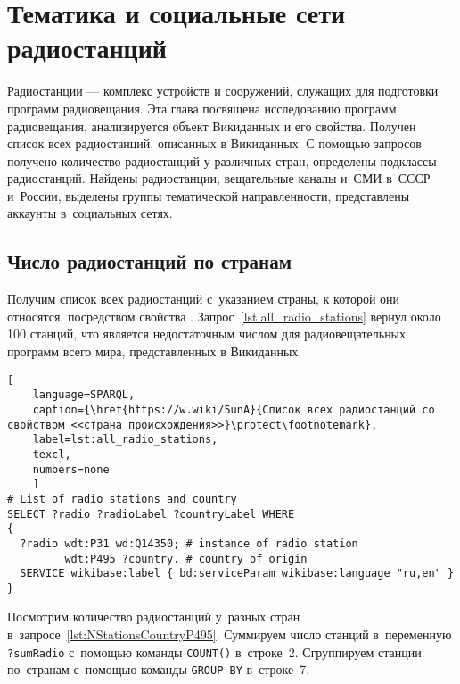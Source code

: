 \chapter{Тематика и социальные сети радиостанций}
\label{ch:radio-station}

Радиостанции --- комплекс устройств и сооружений, служащих для подготовки программ радиовещания. 
Эта глава посвящена исследованию программ радиовещания, 
анализируется объект Викиданных  и его свойства. 
Получен список всех радиостанций, описанных в Викиданных. 
С помощью запросов получено количество радиостанций у различных стран, 
определены подклассы радиостанций. 
Найдены радиостанции, вещательные каналы и~СМИ в~СССР и~России, 
выделены группы тематической направленности, 
представлены аккаунты в~социальных сетях.

\section{Число радиостанций по странам}

Получим список всех радиостанций с~указанием страны, к которой они относятся, 
посредством свойства . 
Запрос~\ref{lst:all_radio_stations} вернул около 100 станций, 
что является недостаточным числом для радиовещательных программ всего мира, представленных в Викиданных.

\begin{lstlisting}[ 
    language=SPARQL,
    caption={\href{https://w.wiki/5unA}{Cписок всех радиостанций со свойством <<страна происхождения>>}\protect\footnotemark},
    label=lst:all_radio_stations,
    texcl,
    numbers=none
    ]
# List of radio stations and country
SELECT ?radio ?radioLabel ?countryLabel WHERE
{
  ?radio wdt:P31 wd:Q14350; # instance of radio station
         wdt:P495 ?country. # country of origin
  SERVICE wikibase:label { bd:serviceParam wikibase:language "ru,en" }
}
\end{lstlisting}%


Посмотрим количество радиостанций у~разных стран в~запросе~\ref{lst:NStationsCountryP495}.
Суммируем число станций в~переменную \lstinline|?sumRadio| 
с~помощью команды \lstinline|COUNT()| в~строке~2. 
Сгруппируем станции по~странам с~помощью команды \lstinline|GROUP BY| в~строке~7.



